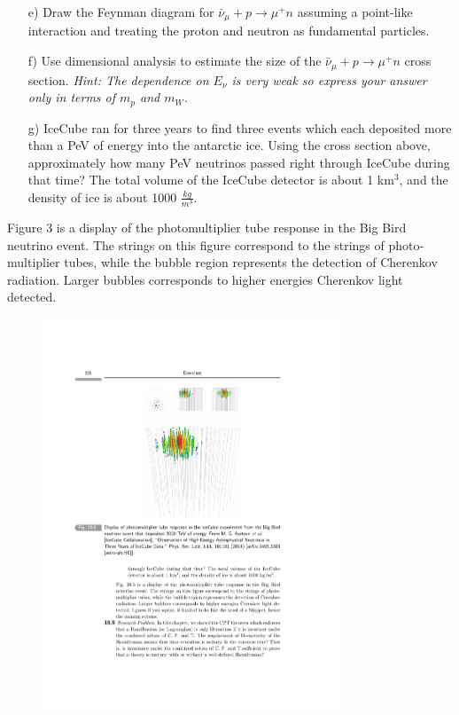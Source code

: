 {\begin{itemize}
{\textit{This property of the scattering angle from part is extremely important for determining the astrophysical source of the high energy neutrinos observed in IceCube. 
In 2016, scientists on the Fermi Gamma Ray Space Telescope found evidence that the neutrino that was responsible for the Big Bird muon was created in a blazar, an enormously energetic radiation source believed to be generated by a supermassive black hole at the center of a galaxy.}
}
\item[e)]{Draw the Feynman diagram for $\bar{\nu}_\mu + p \rightarrow \mu^+ n $ assuming a point-like interaction and treating the proton and neutron as fundamental particles.}
\item[f)]{Use dimensional analysis to estimate the size of the $\bar{\nu}_\mu + p \rightarrow \mu^+ n $ cross section. \textit{Hint: The dependence on $E_\nu$ is very weak so express your answer only in terms of $m_p$ and $m_W$.}
}
\item[g)]{
IceCube ran for three years to find three events which each deposited more than a PeV of energy into the antarctic ice. 
Using the cross section above, approximately how many PeV neutrinos passed right through IceCube during that time? 
The total volume of the IceCube detector is about 1 km$^3$, and the density of ice is about 1000 $\frac{kg}{m^3}$.
}
\end{itemize}

Figure 3 is a display of the photomultiplier tube response in the Big Bird neutrino event. 
The strings on this figure correspond to the strings of photo-multiplier tubes, while the bubble region represents the detection of Cherenkov radiation.
 Larger bubbles corresponds to higher energies Cherenkov light detected. 

\begin{figure}[h!]
\centering
\includegraphics[width=0.8\textwidth]{./IceCubeBigBird.pdf}
\caption{}
\end{figure}


}
